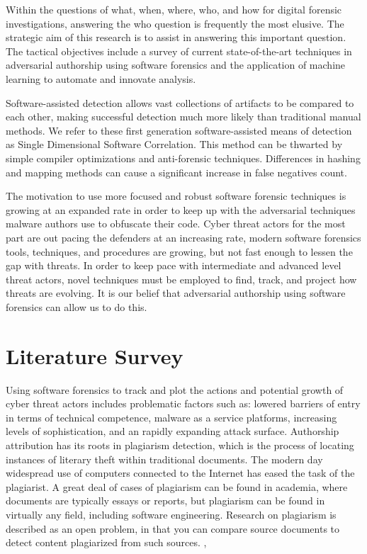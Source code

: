 \documentclass[12pt]{report}
\begin{document}
Within the questions of what, when, where, who, and how for digital forensic investigations, answering the who question is frequently the most elusive.  The strategic aim of this research is to assist in answering this important question.  The tactical objectives include a survey of current state-of-the-art techniques in adversarial authorship using software forensics and the application of machine learning to automate and innovate analysis.

Software-assisted detection allows vast collections of artifacts to be compared to each other, making successful detection much more likely than traditional manual methods.  We refer to these first generation software-assisted means of detection as Single Dimensional Software Correlation.  This method can be thwarted by simple compiler optimizations and anti-forensic techniques.  Differences in hashing and mapping methods can cause a significant increase in false negatives count.

The motivation to use more focused and robust software forensic techniques is growing at an expanded rate in order to keep up with the adversarial techniques malware authors use to obfuscate their code.  Cyber threat actors for the most part are out pacing the defenders at an increasing rate, modern software forensics tools, techniques, and procedures are growing, but not fast enough to lessen the gap with threats.  In order to keep pace with intermediate and advanced level threat actors, novel techniques must be employed to find, track, and project how threats are evolving.  It is our belief that adversarial authorship using software forensics can allow us to do this.

\chapter{Literature Survey}
\label{chap:two}
Using software forensics to track and plot the actions and potential growth of cyber threat actors includes problematic factors such as: lowered barriers of entry in terms of technical competence, malware as a service platforms, increasing levels of sophistication, and an rapidly expanding attack surface.  Authorship attribution has its roots in plagiarism detection, which is the process of locating instances of literary theft within traditional documents.  The modern day widespread use of computers connected to the Internet has eased the task of the plagiarist.  A great deal of cases of plagiarism can be found in academia, where documents are typically essays or reports, but plagiarism can be found in virtually any field, including software engineering. \cite{!stealsc:2012}  Research on plagiarism is described as an open problem, in that you can compare source documents to detect content plagiarized from such sources.  \cite{buruiana2013automatic}, \cite{jhivapd}
\end{document}
